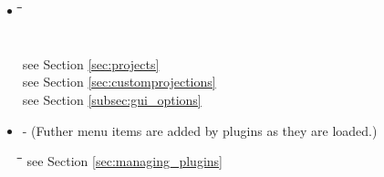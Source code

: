 \begin{itemize}
\item {}
\begin{tabbing}
\hspace{4.5cm}\=\hspace{3cm}\=\hspace{3.5cm}\= \kill
{}  
 \>           
 \>           
 \\
 \>           
 \>           
 \\
 \>
 \>           
 \\
 \> 
 \>           
 see Section \ref{sec:projects}
 \\
\> \>           
see Section \ref{sec:customprojections}
 \\
\> \>           
see Section \ref{subsec:gui_options}
 \\
\end{tabbing}

\item {} - (Futher menu items are added by plugins as they are loaded.)
\begin{tabbing}
\hspace{4.5cm}\=\hspace{3cm}\=\hspace{3.5cm}\= \kill
{}              
\> \>           
see Section \ref{sec:managing_plugins}
 \\
\end{tabbing}    


%
%
%


\end{itemize}
